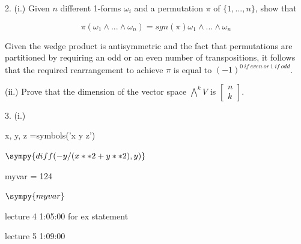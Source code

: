 \documentclass{article}\usepackage[]{graphicx}\usepackage[]{color}
\begin{document}
2. (i.) Given $n$ different 1-forms $\omega_i$ and a permutation $\pi$ of $\lbrace 1,...,n\rbrace$, show that 

$$
\pi(\omega_1\wedge ... \wedge \omega_n)= sgn(\pi)\omega_1\wedge...\wedge\omega_n
$$

Given the wedge product is antisymmetric and the fact that permutations are partitioned by requiring an odd or an even number of transpositions, it follows that the required rearrangement to achieve $\pi$ is equal to $(-1)^{0\ if\ even \ or\ 1\ if \ odd}$.



(ii.) Prove that the dimension of the vector space $\bigwedge^k V$ is 
$\begin{bmatrix}
n \\
k
\end{bmatrix}
$. 

3. (i.) 

\begin{sympycode}
x, y, z =symbols('x y z')
\end{sympycode}

$\sympy{diff(-y/(x**2+y**2),y)}$


\begin{sympycode}
myvar = 124
\end{sympycode}

$\sympy{myvar}$

lecture 4 1:05:00 for ex statement

lecture 5 1:09:00

\cite{arnold1989}

\cite{coopersmith2017}

{}

\end{document}
